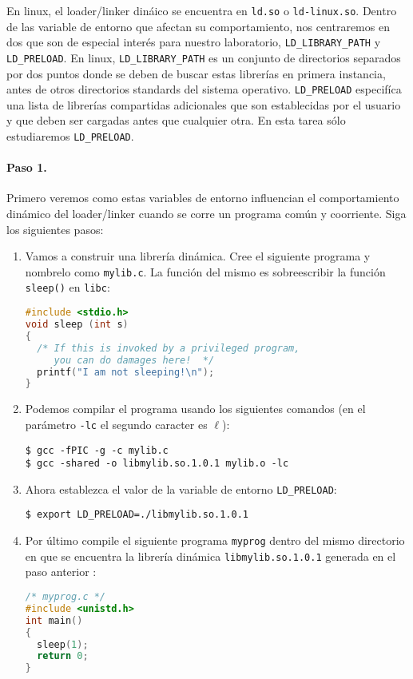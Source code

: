 En linux, el loader/linker dináico se encuentra en {\tt ld.so} o {\tt ld-linux.so}.
Dentro de las variable de entorno que afectan su comportamiento, nos centraremos en dos que son de especial interés para nuestro laboratorio, {\tt LD\_LIBRARY\_PATH} y {\tt LD\_PRELOAD}.
En linux,  {\tt LD\_LIBRARY\_PATH} es un conjunto de directorios separados por dos puntos donde se deben de buscar estas librerías en primera instancia, antes de otros directorios standards del sistema operativo.
{\tt LD\_PRELOAD} especifíca una lista de librerías compartidas adicionales que son establecidas por el usuario y que deben ser cargadas antes que cualquier otra. En esta tarea sólo estudiaremos {\tt LD\_PRELOAD}.


\paragraph{Paso 1.}
Primero veremos como estas variables de entorno influencian el comportamiento dinámico del loader/linker cuando se corre un programa común y coorriente.
Siga los siguientes pasos:


\begin{enumerate}

  \item Vamos a construir una librería dinámica. Cree el siguiente programa y nombrelo como {\tt mylib.c}. La función del mismo es sobreescribir la función {\tt sleep()} en {\tt libc}:

\begin{lstlisting}[language=C]
#include <stdio.h>
void sleep (int s)
{
  /* If this is invoked by a privileged program,
     you can do damages here!  */
  printf("I am not sleeping!\n");
}
\end{lstlisting}

 \item Podemos compilar el programa usando los siguientes comandos (en el parámetro {\tt -lc} el segundo caracter es $\ell$):

\begin{lstlisting}
$ gcc -fPIC -g -c mylib.c
$ gcc -shared -o libmylib.so.1.0.1 mylib.o -lc
\end{lstlisting}



  \item Ahora establezca el valor de la variable de entorno {\tt LD\_PRELOAD}:
\begin{lstlisting}
$ export LD_PRELOAD=./libmylib.so.1.0.1
\end{lstlisting}

 \item Por último compile el siguiente programa {\tt myprog} dentro del mismo directorio en que se encuentra la librería dinámica {\tt libmylib.so.1.0.1} generada en el paso anterior :

\begin{lstlisting}[language=C]
/* myprog.c */
#include <unistd.h>
int main()
{
  sleep(1);
  return 0;
}
\end{lstlisting}
\end{enumerate}


